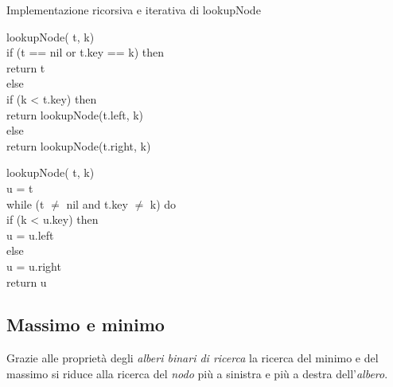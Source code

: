 \begin{code}{Implementazione ricorsiva e iterativa di lookupNode}
    \begin{minipage}[t]{0.50\textwidth}
        \rmbreak\ind{} lookupNode( t,  k)\\
            \indf if (t == nil or t.key == k) then\\
                return t\\
            \indf else\\
                \indff if (k < t.key) then\\
                    return lookupNode(t.left, k)\\
                \indff else\\
                    return lookupNode(t.right, k)\\
    \end{minipage}
    \hfill
    \begin{minipage}[t]{0.48\textwidth}
        \rmbreak\ind{} lookupNode( t,  k)\\
             u = t\\
            \indf while (t $\neq$ nil and t.key $\neq$ k) do\\
                \indff if (k < u.key) then\\
                    u = u.left\\
                \indff else\\
                    u = u.right\\
            \indf return u
    \end{minipage}
\end{code}

\subsection{Massimo e minimo}
Grazie alle proprietà degli \emph{alberi binari di ricerca} la ricerca del
minimo e del massimo si riduce alla ricerca del \emph{nodo} più a sinistra
e più a destra dell'\emph{albero}.

